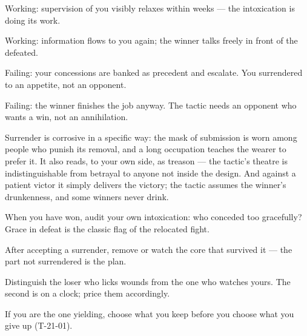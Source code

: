 \begin{feedback}
  \item Working: supervision of you visibly relaxes within weeks --- the intoxication is doing its work.
  \item Working: information flows to you again; the winner talks freely in front of the defeated.
  \item Failing: your concessions are banked as precedent and escalate. You surrendered to an appetite, not an opponent.
  \item Failing: the winner finishes the job anyway. The tactic needs an opponent who wants a win, not an annihilation.
\end{feedback}
\begin{failure}
Surrender is corrosive in a specific way: the mask of submission is worn among people who punish its removal, and a long occupation teaches the wearer to prefer it. It also reads, to your own side, as treason --- the tactic's theatre is indistinguishable from betrayal to anyone not inside the design. And against a patient victor it simply delivers the victory; the tactic assumes the winner's drunkenness, and some winners never drink.
\end{failure}
\begin{countermeasures}
  \item When you have won, audit your own intoxication: who conceded too gracefully? Grace in defeat is the classic flag of the relocated fight.
  \item After accepting a surrender, remove or watch the core that survived it --- the part not surrendered is the plan.
  \item Distinguish the loser who licks wounds from the one who watches yours. The second is on a clock; price them accordingly.
  \item If you are the one yielding, choose what you keep before you choose what you give up (T-21-01).
\end{countermeasures}

\seesources
{}
